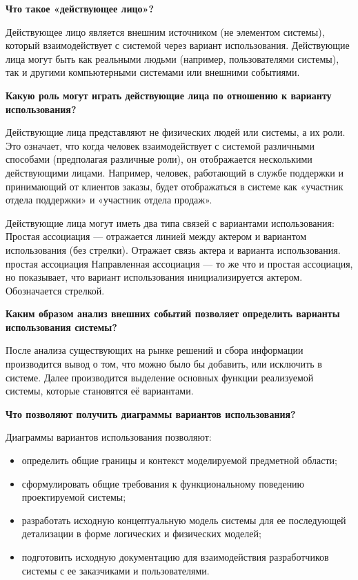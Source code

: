 \textbf{Что такое «действующее лицо»?}\par
Действующее лицо является внешним источником (не элементом системы),
который взаимодействует с системой через вариант использования.
Действующие лица могут быть как реальными людьми (например, пользователями системы),
так и другими компьютерными системами или внешними событиями.\par
\vfill
\textbf{Какую роль могут играть действующие лица по отношению к варианту использования?}\par
Действующие лица представляют не физических людей или системы, а их роли.
Это означает, что когда человек взаимодействует с системой различными способами (предполагая различные роли),
он отображается несколькими действующими лицами.
Например, человек, работающий в службе поддержки и принимающий от клиентов заказы,
будет отображаться в системе как «участник отдела поддержки» и «участник отдела продаж».\par
Действующие лица могут иметь два типа связей с вариантами использования:
Простая ассоциация — отражается линией между актером и вариантом использования (без стрелки).
Отражает связь актера и варианта использования.
простая ассоциация
Направленная ассоциация — то же что и простая ассоциация, но показывает, что вариант использования инициализируется актером.
Обозначается стрелкой.\par

\textbf{Каким образом анализ внешних событий позволяет определить варианты использования системы?}\par
После анализа существующих на рынке решений и сбора информации производится вывод о том, что можно было бы добавить,
или исключить в системе.
Далее производится выделение основных функции реализуемой системы, которые становятся её вариантами.\par

\textbf{Что позволяют получить диаграммы вариантов использования?}\par
Диаграммы вариантов использования позволяют:
\begin{itemize}
	\item определить общие границы и контекст моделируемой предметной области;
	\item сформулировать общие требования к функциональному поведению проектируемой системы;
	\item разработать исходную концептуальную модель системы для ее последующей детализации в форме логических и физических моделей;
	\item подготовить исходную документацию для взаимодействия разработчиков системы с ее заказчиками и пользователями.
	\end{itemize}

